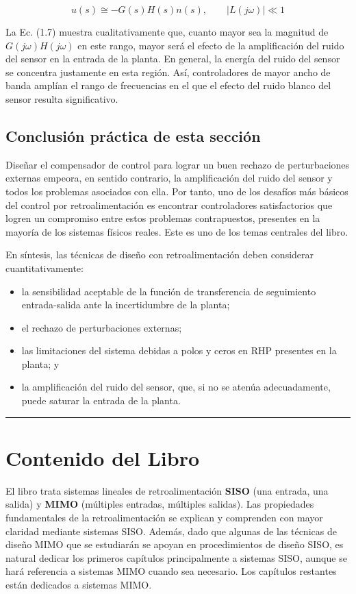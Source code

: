 \[
 u(s) \cong -G(s)H(s)n(s), \qquad |L(j\omega)| \ll 1 \tag{1.7}
\]

La Ec. (1.7) muestra cualitativamente que, cuanto mayor sea la magnitud de \(G(j\omega)H(j\omega)\) en este rango, mayor será el efecto de la amplificación del ruido del sensor en la entrada de la planta. En general, la energía del ruido del sensor se concentra justamente en esta región. Así, controladores de mayor ancho de banda amplían el rango de frecuencias en el que el efecto del ruido blanco del sensor resulta significativo.

\subsection{Conclusión práctica de esta sección}
Diseñar el compensador de control para lograr un buen rechazo de perturbaciones externas empeora, en sentido contrario, la amplificación del ruido del sensor y todos los problemas asociados con ella. Por tanto, uno de los desafíos más básicos del control por retroalimentación es encontrar controladores satisfactorios que logren un compromiso entre estos problemas contrapuestos, presentes en la mayoría de los sistemas físicos reales. Este es uno de los temas centrales del libro.

En síntesis, las técnicas de diseño con retroalimentación deben considerar cuantitativamente:

\begin{itemize}
  \item la sensibilidad aceptable de la función de transferencia de seguimiento entrada-salida ante la incertidumbre de la planta;
  \item el rechazo de perturbaciones externas;
  \item las limitaciones del sistema debidas a polos y ceros en RHP presentes en la planta; y
  \item la amplificación del ruido del sensor, que, si no se atenúa adecuadamente, puede saturar la entrada de la planta.
\end{itemize}

\noindent\rule{\textwidth}{0.5pt}

\section{Contenido del Libro}
El libro trata sistemas lineales de retroalimentación \textbf{SISO} (una entrada, una salida) y \textbf{MIMO} (múltiples entradas, múltiples salidas). Las propiedades fundamentales de la retroalimentación se explican y comprenden con mayor claridad mediante sistemas SISO. Además, dado que algunas de las técnicas de diseño MIMO que se estudiarán se apoyan en procedimientos de diseño SISO, es natural dedicar los primeros capítulos principalmente a sistemas SISO, aunque se hará referencia a sistemas MIMO cuando sea necesario. Los capítulos restantes están dedicados a sistemas MIMO.

